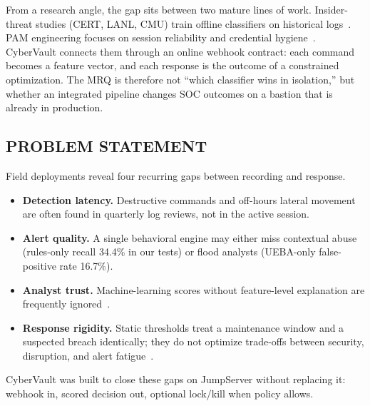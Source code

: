 \documentclass{ieeeaccess}
\begin{document}
From a research angle, the gap sits between two mature lines of work. Insider-threat studies (CERT, LANL, CMU) train offline classifiers on historical logs~\cite{ref10,ref24}. PAM engineering focuses on session reliability and credential hygiene~\cite{ref1,ref26}. CyberVault connects them through an online webhook contract: each command becomes a feature vector, and each response is the outcome of a constrained optimization. The MRQ is therefore not ``which classifier wins in isolation,'' but whether an integrated pipeline changes SOC outcomes on a bastion that is already in production.

\subsection{PROBLEM STATEMENT}
Field deployments reveal four recurring gaps between recording and response.
\begin{itemize}
\item \textbf{Detection latency.} Destructive commands and off-hours lateral movement are often found in quarterly log reviews, not in the active session.
\item \textbf{Alert quality.} A single behavioral engine may either miss contextual abuse (rules-only recall 34.4\% in our tests) or flood analysts (UEBA-only false-positive rate 16.7\%).
\item \textbf{Analyst trust.} Machine-learning scores without feature-level explanation are frequently ignored~\cite{ref12,ref13}.
\item \textbf{Response rigidity.} Static thresholds treat a maintenance window and a suspected breach identically; they do not optimize trade-offs between security, disruption, and alert fatigue~\cite{ref14,ref15}.
\end{itemize}
CyberVault was built to close these gaps on JumpServer without replacing it: webhook in, scored decision out, optional lock/kill when policy allows.
\end{document}

